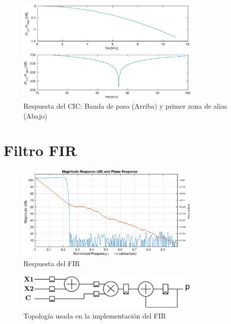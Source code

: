 \documentclass[a4paper,conference]{IEEEtran}
\begin{document}
\begin{figure}[!t]
\centering
\includegraphics[width=3.5in]{Respuesta_CIC}
\caption{Respuesta del CIC: Banda de paso (Arriba) y primer zona de alias (Abajo)}
\label{fig:CIC_resp}
\end{figure}

\section{Filtro FIR}

\begin{figure}[!t]
	\centering
	\includegraphics[width=3.5in]{Respuesta_FIR}
	\caption{Respuesta del FIR}
	\label{fig:FIR_res}
\end{figure}


\begin{figure}[!t]
\centering
\includegraphics[width=3.5in]{FIR_Topologia}
\caption{Topolog\'ia usada en la implementaci\'on del FIR}
\label{fig:FIR_top}
\end{figure}
\end{document}
